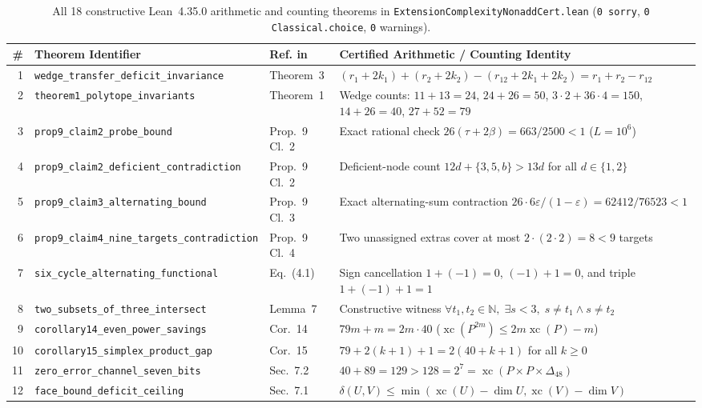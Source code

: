 \documentclass[10pt,twocolumn]{article}
\begin{document}
\begin{table}[tb]
\centering
\caption{All 18 constructive Lean~4.35.0 arithmetic and counting theorems in \texttt{ExtensionComplexityNonaddCert.lean} (\texttt{0 sorry}, \texttt{0 Classical.choice}, \texttt{0} warnings).}
\label{tab:lean}
\footnotesize
\begin{tabular}{@{}rllp{6.7cm}@{}}
\toprule
\# & Theorem Identifier & Ref. in~\cite{Liu2026} & Certified Arithmetic / Counting Identity \\
\midrule
1 & \texttt{wedge\_transfer\_deficit\_invariance} & Theorem~3 & $(r_1+2k_1)+(r_2+2k_2)-(r_{12}+2k_1+2k_2) = r_1+r_2-r_{12}$ \\
2 & \texttt{theorem1\_polytope\_invariants} & Theorem~1 & Wedge counts: $11+13=24$, $24+26=50$, $3\cdot 2+36\cdot 4=150$, $14+26=40$, $27+52=79$ \\
3 & \texttt{prop9\_claim2\_probe\_bound} & Prop.~9 Cl.~2 & Exact rational check $26(\tau + 2\beta) = 663/2500 < 1$ ($L=10^6$) \\
4 & \texttt{prop9\_claim2\_deficient\_contradiction} & Prop.~9 Cl.~2 & Deficient-node count $12d+\{3,5,b\} > 13d$ for all $d \in \{1,2\}$ \\
5 & \texttt{prop9\_claim3\_alternating\_bound} & Prop.~9 Cl.~3 & Exact alternating-sum contraction $26\cdot 6\varepsilon/(1-\varepsilon) = 62412/76523 < 1$ \\
6 & \texttt{prop9\_claim4\_nine\_targets\_contradiction} & Prop.~9 Cl.~4 & Two unassigned extras cover at most $2\cdot(2\cdot 2) = 8 < 9$ targets \\
7 & \texttt{six\_cycle\_alternating\_functional} & Eq.~(4.1) & Sign cancellation $1+(-1)=0$, $(-1)+1=0$, and triple $1+(-1)+1=1$ \\
8 & \texttt{two\_subsets\_of\_three\_intersect} & Lemma~7 & Constructive witness $\forall t_1, t_2 \in \mathbb{N},\;\exists s < 3,\; s\neq t_1 \wedge s\neq t_2$ \\
9 & \texttt{corollary14\_even\_power\_savings} & Cor.~14 & $79m + m = 2m\cdot 40$ ($\operatorname{xc}(P^{2m}) \leq 2m\operatorname{xc}(P) - m$) \\
10 & \texttt{corollary15\_simplex\_product\_gap} & Cor.~15 & $79 + 2(k+1) + 1 = 2(40 + k + 1)$ for all $k \geq 0$ \\
11 & \texttt{zero\_error\_channel\_seven\_bits} & Sec.~7.2 & $40 + 89 = 129 > 128 = 2^7 = \operatorname{xc}(P \times P \times \Delta_{48})$ \\
12 & \texttt{face\_bound\_deficit\_ceiling} & Sec.~7.1 & $\delta(U, V) \leq \min(\operatorname{xc}(U)-\dim U, \operatorname{xc}(V)-\dim V)$ \\

\end{tabular}
\end{table}
\end{document}
